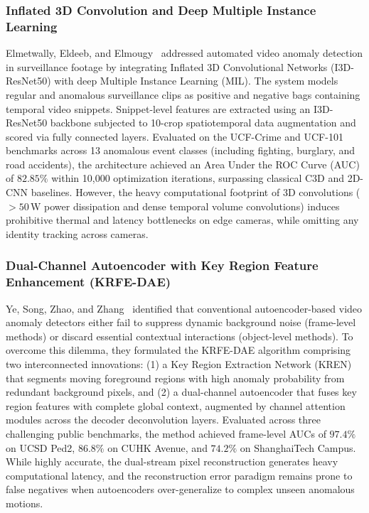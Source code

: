 \documentclass[12pt,a4paper]{report}
\begin{document}
\subsubsection{Inflated 3D Convolution and Deep Multiple Instance Learning}
Elmetwally, Eldeeb, and Elmougy~\cite{ref_elmetwally2024_i3d} addressed automated video anomaly detection in surveillance footage by integrating Inflated 3D Convolutional Networks (I3D-ResNet50) with deep Multiple Instance Learning (MIL). The system models regular and anomalous surveillance clips as positive and negative bags containing temporal video snippets. Snippet-level features are extracted using an I3D-ResNet50 backbone subjected to 10-crop spatiotemporal data augmentation and scored via fully connected layers. Evaluated on the UCF-Crime and UCF-101 benchmarks across 13 anomalous event classes (including fighting, burglary, and road accidents), the architecture achieved an Area Under the ROC Curve (AUC) of $82.85\%$ within 10,000 optimization iterations, surpassing classical C3D and 2D-CNN baselines. However, the heavy computational footprint of 3D convolutions ($>50\,\text{W}$ power dissipation and dense temporal volume convolutions) induces prohibitive thermal and latency bottlenecks on edge cameras, while omitting any identity tracking across cameras.

\subsubsection{Dual-Channel Autoencoder with Key Region Feature Enhancement (KRFE-DAE)}
Ye, Song, Zhao, and Zhang~\cite{ref_ye2024_krfe} identified that conventional autoencoder-based video anomaly detectors either fail to suppress dynamic background noise (frame-level methods) or discard essential contextual interactions (object-level methods). To overcome this dilemma, they formulated the KRFE-DAE algorithm comprising two interconnected innovations: (1) a Key Region Extraction Network (KREN) that segments moving foreground regions with high anomaly probability from redundant background pixels, and (2) a dual-channel autoencoder that fuses key region features with complete global context, augmented by channel attention modules across the decoder deconvolution layers. Evaluated across three challenging public benchmarks, the method achieved frame-level AUCs of $97.4\%$ on UCSD Ped2, $86.8\%$ on CUHK Avenue, and $74.2\%$ on ShanghaiTech Campus. While highly accurate, the dual-stream pixel reconstruction generates heavy computational latency, and the reconstruction error paradigm remains prone to false negatives when autoencoders over-generalize to complex unseen anomalous motions.
\end{document}
